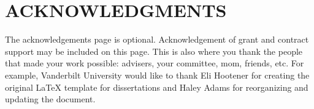 
\chapter*{ACKNOWLEDGMENTS}
\vspace{7mm}

The acknowledgements page is optional. Acknowledgement of grant and contract support may be included on this page. This is also where you thank the people that made your work possible: advisers, your committee, mom, friends, etc. For example, Vanderbilt University would like to thank Eli Hootener for creating the original  \LaTeX{}  template for dissertations and Haley Adams for reorganizing and updating the document. 
